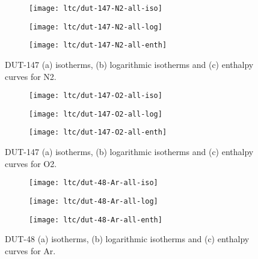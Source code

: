 \begin{figure}[htb]
    \centering
    \begin{subfigure}{0.33\linewidth}
        \texttt{[image: ltc/dut-147-N2-all-iso]}%
        \caption{}
    \end{subfigure}%
    \begin{subfigure}{0.33\linewidth}
        \texttt{[image: ltc/dut-147-N2-all-log]}%
        \caption{}
    \end{subfigure}%
    \begin{subfigure}{0.33\linewidth}
        \texttt{[image: ltc/dut-147-N2-all-enth]}%
        \caption{}
    \end{subfigure}%
    \caption{DUT-147 (a) isotherms, (b) logarithmic isotherms and 
    (c) enthalpy curves for N2.}%
    \label{appx:dut:fgr:dut-147-N2-ltc}
\end{figure}

\begin{figure}[htb]
    \centering
    \begin{subfigure}{0.33\linewidth}
        \texttt{[image: ltc/dut-147-O2-all-iso]}%
        \caption{}
    \end{subfigure}%
    \begin{subfigure}{0.33\linewidth}
        \texttt{[image: ltc/dut-147-O2-all-log]}%
        \caption{}
    \end{subfigure}%
    \begin{subfigure}{0.33\linewidth}
        \texttt{[image: ltc/dut-147-O2-all-enth]}%
        \caption{}
    \end{subfigure}%
    \caption{DUT-147 (a) isotherms, (b) logarithmic isotherms and 
    (c) enthalpy curves for O2.}%
    \label{appx:dut:fgr:dut-147-O2-ltc}
\end{figure}

\begin{figure}[htb]
    \centering
    \begin{subfigure}{0.33\linewidth}
        \texttt{[image: ltc/dut-48-Ar-all-iso]}%
        \caption{}
    \end{subfigure}%
    \begin{subfigure}{0.33\linewidth}
        \texttt{[image: ltc/dut-48-Ar-all-log]}%
        \caption{}
    \end{subfigure}%
    \begin{subfigure}{0.33\linewidth}
        \texttt{[image: ltc/dut-48-Ar-all-enth]}%
        \caption{}
    \end{subfigure}%
    \caption{DUT-48 (a) isotherms, (b) logarithmic isotherms and 
    (c) enthalpy curves for Ar.}%
    \label{appx:dut:fgr:dut-48-Ar-ltc}
\end{figure}

